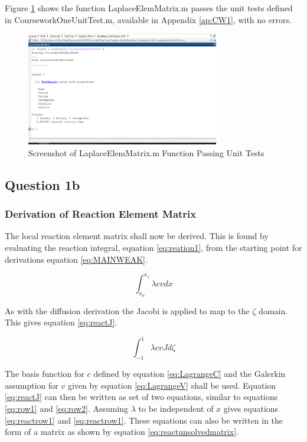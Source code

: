 \documentclass[11pt]{article}
\begin{document}
Figure \ref{fig:passTest1} shows the function LaplaceElemMatrix.m passes the unit tests defined in CourseworkOneUnitTest.m, available in Appendix \ref{ap:CW1}, with no errors.

\begin{figure}[h!]
	\centering
	\includegraphics[width=0.75\textwidth]{CW1Test.PNG}
	\caption{Screenshot of LaplaceElemMatrix.m Function Passing Unit Tests}\label{fig:passTest1}
\end{figure}



\subsection{Question 1b}
\subsubsection{Derivation of Reaction Element Matrix}

The local reaction element matrix shall now be derived. This is found by evaluating the reaction integral, equation \ref{eq:reation1}, from the starting point for derivations equation \ref{eq:MAINWEAK}.

\begin{equation} \label{eq:reation1}
\int_{x_{0}}^{x_{1}} \lambda c v  dx
\end{equation}

As with the diffusion derivation the Jacobi is applied to map to the $\zeta$ domain. This gives equation \ref{eq:reactJ}.

\begin{equation}
\label{eq:reactJ}
\int_{-1}^1 \lambda c v J d\zeta
\end{equation}

The basis function for $c$ defined by equation \ref{eq:LagrangeC} and the Galerkin assumption for $v$ given by equation \ref{eq:LagrangeV} shall be used. Equation \ref{eq:reactJ} can then be written as set of two equations, similar to equations \ref{eq:row1} and \ref{eq:row2}. Assuming $\lambda$ to be independent of $x$ gives equations \ref{eq:reactrow1} and \ref{eq:reactrow1}. These equations can also be written in the form of a matrix as shown by equation \ref{eq:reactunsolvedmatrix}.
\end{document}
